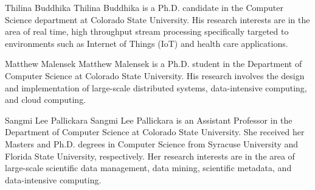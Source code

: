 \documentclass[9pt,journal,compsoc]{IEEEtran}
\begin{document}


\vspace*{-3\baselineskip}
\begin{IEEEbiography}{Thilina Buddhika}
Thilina Buddhika is a Ph.D. candidate in the Computer Science department at Colorado State University.  His research interests are in the area of real time, high throughput stream processing specifically targeted to environments such as Internet of Things (IoT) and health care applications.
\end{IEEEbiography}
\vspace{-2cm}
\begin{IEEEbiography}{Matthew Malensek}
Matthew Malensek is a Ph.D. student in the Department of Computer Science at Colorado State University. His research involves the design and implementation of large-scale distributed systems, data-intensive computing, and cloud computing.
\end{IEEEbiography}
%
\vspace{-2cm}
\begin{IEEEbiography}{Sangmi Lee Pallickara}
Sangmi Lee Pallickara is an Assistant Professor in the Department of Computer Science at Colorado State University. She received her Masters and Ph.D. degrees in Computer Science from Syracuse University and Florida State University, respectively. Her research interests are in the area of large-scale scientific data management, data mining, scientific metadata, and data-intensive computing.
\end{IEEEbiography}
\end{document}
